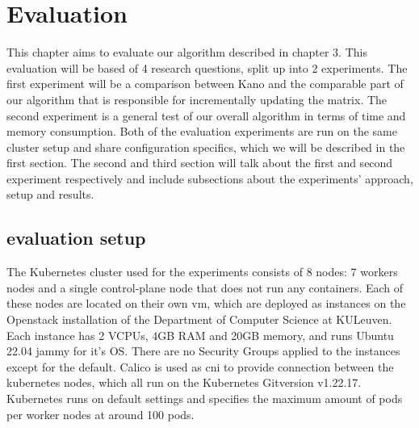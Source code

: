 \chapter{Evaluation}                                 \label{ch:evaluation}
This chapter aims to evaluate our algorithm described in chapter 3. This evaluation will be based of 4 research questions, split up into 2 experiments. The first experiment will be a comparison between Kano and the comparable part of our algorithm that is responsible for incrementally updating the matrix. The second experiment is a general test of our overall algorithm in terms of time and memory consumption. Both of the evaluation experiments are run on the same cluster setup and share configuration specifics, which we will be described in the first section. The second and third section will talk about the first and second experiment respectively and include subsections about the experiments' approach, setup and results. 
\\[10pt]

\section{evaluation setup} \label{sec:evalsetup}


The Kubernetes cluster used for the experiments consists of 8 nodes: 7 workers nodes and a single control-plane node that does not run any containers. Each of these nodes are located on their own \acrshort{vm}, which are deployed as instances on the Openstack installation of the Department of Computer Science at KULeuven. Each instance has 2 VCPUs, 4GB RAM and 20GB memory, and runs Ubuntu 22.04 jammy for it's OS. There are no Security Groups applied to the instances except for the default. Calico is used as \acrshort{cni} to provide connection between the kubernetes nodes, which all run on the Kubernetes Gitversion v1.22.17. Kubernetes runs on default settings and specifies the maximum amount of pods per worker nodes at around 100 pods.
\\[10pt]

